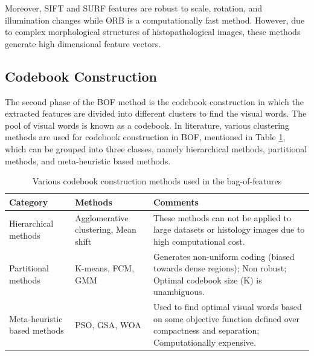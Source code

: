Moreover, SIFT and SURF features are robust to scale, rotation, and illumination changes while ORB is a computationally fast method. However, due to complex morphological structures of histopathological images, these methods generate high dimensional feature vectors.


\subsection{Codebook Construction}\label{subsec:Codebook Construction}

The second phase of the BOF method is the codebook construction in which the extracted features are divided into different clusters to find the visual words. The pool of visual words is known as a codebook. In literature, various clustering methods are used for codebook construction in BOF, mentioned in Table \ref{Tab:clustering}, which can be grouped into three classes, namely hierarchical methods, partitional methods, and meta-heuristic based methods. 

\begin{table}
\renewcommand{\arraystretch}{1.5}
\caption [Various codebook construction methods used in the bag-of-features]{ \fontsize{10pt}{12pt}\selectfont Various codebook construction methods used in the bag-of-features \cite{jurie2005}}
\label{Tab:clustering}
\centering
    
\footnotesize{
\begin{tabular}{p{3cm}|p{4cm}|p{7cm}}

     \hline
    
    \textbf{Category} &\textbf{Methods}  &  \textbf{Comments}\\
     \hline 
    Hierarchical methods & Agglomerative clustering, Mean shift  & These methods can not be applied to large datasets or histology images due to high computational cost. \\

Partitional methods & K-means, FCM, GMM  & Generates non-uniform coding (biased towards dense regions); \newline Non robust; \newline Optimal codebook size (K) is unambiguous.\\


Meta-heuristic based methods & PSO, GSA, WOA & Used to find optimal visual words based on some objective function defined over compactness and separation; \newline Computationally expensive. \\


\hline
\end{tabular}
}
\end{table}

